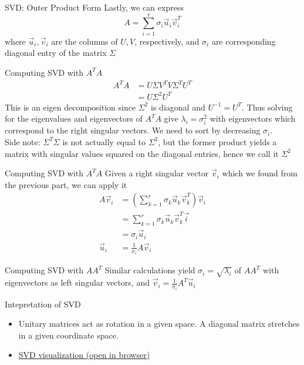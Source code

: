 \documentclass{beamer}
\begin{document}
\begin{frame}{SVD: Outer Product Form}
Lastly, we can express
\[ A = \sum_{i = 1}^r \sigma_i \vec{u}_i \vec{v}_i^T \]
where $\vec{u}_i, \vec{v}_i$ are the columns of $U, V$, respectively, and $\sigma_i$ are corresponding diagonal entry of the matrix $\Sigma$
\end{frame}

\begin{frame}{Computing SVD with $A^T A$}
\begin{align*}
A^T A &= U \Sigma V^T V \Sigma^T U^T \\
&= U \Sigma^2 U^T
\end{align*}
This is an eigen decomposition since $\Sigma^2$ is diagonal and $U^{-1} = U^T$. Thus solving for the eigenvalues and eigenvectors of $A^T A$ give $\lambda_i = \sigma_i^2$ with eigenvectors which correspond to the right singular vectors. We need to sort by decreasing $\sigma_i$. \\

\alert{Side note:} $\Sigma^T \Sigma$ is not actually equal to $\Sigma^2$, but the former product yields a matrix with singular values squared on the diagonal entries, hence we call it $\Sigma^2$
\end{frame}

\begin{frame}{Computing SVD with $A^T A$}
Given a right singular vector $\vec{v}_i$ which we found from the previous part, we can apply it
\begin{align*}
A \vec{v}_i &= \left( \sum_{k = 1}^r \sigma_k \vec{u}_k \vec{v}_k^T \right) \vec{v}_i \\
&= \sum_{k = 1}^r \sigma_k \vec{u}_k \vec{v}_k^T \vec{i} \\
&= \sigma_i \vec{u}_i \\
\vec{u}_i &= \frac{1}{\sigma_i} A \vec{v}_i
\end{align*}
\end{frame}

\begin{frame}{Computing SVD with $A A^T$}
Similar calculations yield $\sigma_i = \sqrt{\lambda_i}$ of $A A^T$ with eigenvectors as left singular vectors, and $\vec{v}_i = \frac{1}{\sigma_i} A^T \vec{u}_i$
\end{frame}

\begin{frame}{Intepretation of SVD}
\begin{itemize}
\item Unitary matrices act as rotation in a given space. A diagonal matrix stretches in a given coordinate space.

\item \href{https://en.wikipedia.org/wiki/File:Singular_value_decomposition.gif}{SVD visualization (open in browser)}
\end{itemize}
\end{frame}
\end{document}
